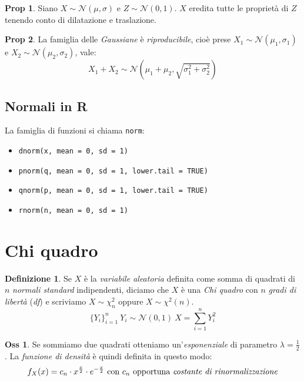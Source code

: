 \documentclass[12pt, a4paper]{report}
\theoremstyle{definition}
\newtheorem{definition}{Definizione}[section]
\newtheorem*{proposition}{Prop}
\newtheorem*{observation}{Oss}
\DeclareRobustCommand{\norm}{\mathcal{N}}
\begin{document}
\begin{proposition}
	Siano $X\sim\norm(\mu,\sigma)$ e $Z\sim\norm(0,1)$. $X$ eredita tutte le
	proprietà di $Z$ tenendo conto di dilatazione e traslazione.
\end{proposition}
\begin{proposition}
	La famiglia delle \emph{Gaussiane} è \emph{riproducibile}, cioè prese
	$X_1\sim\norm(\mu_1,\sigma_1)$ e $X_2\sim\norm(\mu_2,\sigma_2)$, vale:
	\[X_1+X_2\sim\norm(\mu_1+\mu_2, \sqrt{\sigma_1^2+\sigma_2^2})\]
\end{proposition}

\subsection{Normali in R}
La famiglia di funzioni si chiama \texttt{norm}:
\begin{itemize}
	\item \texttt{dnorm(x, mean = 0, sd = 1)}
	\item \texttt{pnorm(q, mean = 0, sd = 1, lower.tail = TRUE)}
	\item \texttt{qnorm(p, mean = 0, sd = 1, lower.tail = TRUE)}
	\item \texttt{rnorm(n, mean = 0, sd = 1)}
\end{itemize}

\section{Chi quadro}

\begin{definition}
	Se $X$ è la \emph{variabile aleatoria} definita come somma di quadrati di $n$
	\emph{normali standard} indipendenti, diciamo che $X$ è una \emph{Chi quadro}
	con $n$ \emph{gradi di libertà} (\emph{df}) e scriviamo \(X\sim\chi_n^2 \)
	oppure \(X\sim\chi^2(n)\).
	\[\{Y_i\}_{i=1}^n\ Y_i\sim\norm(0,1)\ X=\sum_{i=1}^nY^2_i\]
\end{definition}
\begin{observation}
	Se sommiamo due quadrati otteniamo un'\emph{esponenziale} di parametro
	\(\lambda=\frac{1}{2}\). La \emph{funzione di densità} è quindi definita in
	questo modo:
	\[f_X(x)=c_n\cdot x^{\frac{x}{2}}\cdot e^{-\frac{x}{2}}\ \text{con $c_n$ opportuna
	\emph{costante di rinormalizzazione}}\]
\end{observation}
\end{document}
